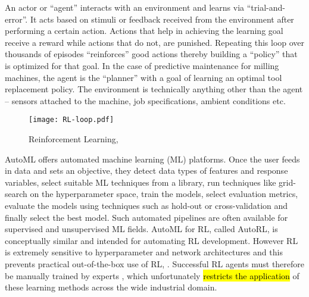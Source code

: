 \documentclass[referee, sn-mathphys-num]{sn-jnl}
\newcommand{\hlc}[2][cyan!15]{{\colorlet{foo}{#1}\sethlcolor{foo}\hl{#2}}}
\begin{document}
	An actor or ``agent'' interacts with an environment and learns via ``trial-and-error''. It acts based on stimuli or feedback received from the environment after performing a certain action. Actions that help in achieving the learning goal receive a reward while actions that do not, are punished. Repeating this loop over thousands of episodes ``reinforces'' good actions thereby building a ``policy'' that is optimized for that goal. In the case of predictive maintenance for milling machines, the agent is the ``planner'' with a goal of learning an optimal tool replacement policy. The environment is technically anything other than the agent -- sensors attached to the machine, job specifications, ambient conditions etc.
	\begin{figure}[h]
		\centering
		\texttt{[image: RL-loop.pdf]}
		\caption{Reinforcement Learning, \cite{barto2018}}
		\label{fig_RL-loop}
	\end{figure}
	
	AutoML offers automated machine learning (ML) platforms. Once the user feeds in data and sets an objective, they detect data types of features and response variables, select suitable ML techniques from a library, run techniques like grid-search on the hyperparameter space, train the models, select evaluation metrics, evaluate the models using techniques such as hold-out or cross-validation and finally select the best model. Such automated pipelines are often available for supervised and unsupervised ML fields. AutoML for RL, called AutoRL, is conceptually similar and intended for automating RL development. However RL is extremely sensitive to hyperparameter and network architectures and this prevents practical out-of-the-box use of RL, \cite{autorl:shala2022, autorl:afshar2022}. Successful RL agents must therefore be manually trained by experts \cite{autorl:parker2022}, which unfortunately \hlc{restricts the application} of these learning methods across the wide industrial domain.
	
\end{document}
